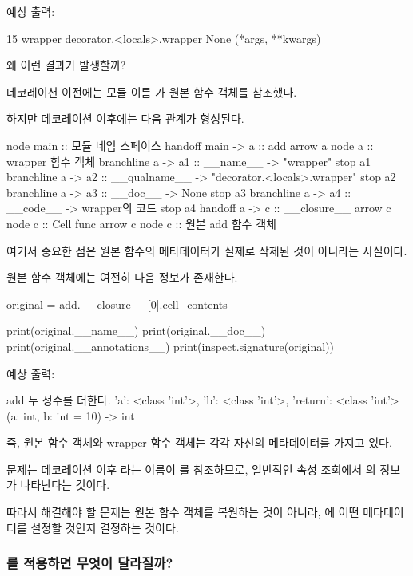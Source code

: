 예상 출력:

\begin{dhkzsh}
15
wrapper
decorator.<locals>.wrapper
None
{}
(*args, **kwargs)
\end{dhkzsh}

왜 이런 결과가 발생할까?

데코레이션 이전에는 모듈 이름 가 원본 함수 객체를 참조했다.

하지만 데코레이션 이후에는 다음 관계가 형성된다.

\begin{dhkbranch}[in=2]
node main :: 모듈 네임 스페이스
handoff main -> a :: add
arrow a
node a :: wrapper 함수 객체
branchline a -> a1 :: __name__ -> "wrapper"
stop a1
branchline a -> a2 :: __qualname__ -> "decorator.<locals>.wrapper"
stop a2
branchline a -> a3 :: __doc__ -> None
stop a3
branchline a -> a4 :: __code__ -> wrapper의 코드
stop a4
handoff a -> c :: __closure__
arrow c
node c :: Cell func
arrow c
node c :: 원본 add 함수 객체
\end{dhkbranch}

여기서 중요한 점은 원본 함수의 메타데이터가 실제로 삭제된 것이 아니라는 사실이다.

원본 함수 객체에는 여전히 다음 정보가 존재한다.

\begin{dhkcode}
original = add.__closure__[0].cell_contents

print(original.__name__)
print(original.__doc__)
print(original.__annotations__)
print(inspect.signature(original))
\end{dhkcode}

예상 출력:

\begin{dhkzsh}
add
두 정수를 더한다.
{'a': <class 'int'>, 'b': <class 'int'>, 'return': <class 'int'>}
(a: int, b: int = 10) -> int
\end{dhkzsh}

즉, 원본 함수 객체와 wrapper 함수 객체는 각각 자신의 메타데이터를 가지고 있다.

문제는 데코레이션 이후 라는 이름이 를 참조하므로, 일반적인 속성 조회에서 의 정보가 나타난다는 것이다.

따라서 해결해야 할 문제는 원본 함수 객체를 복원하는 것이 아니라, 에 어떤 메타데이터를 설정할 것인지 결정하는 것이다.

\subsubsection{를 적용하면 무엇이 달라질까?}

